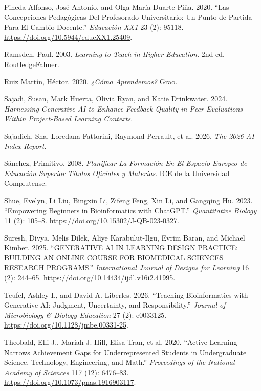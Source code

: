 \documentclass[
  11pt,
  a4paper,
  twoside]{scrreprt}
\newlength{\cslhangindent}
\newenvironment{CSLReferences}[2] %
 {\begin{list}{}{%
  \setlength{\itemindent}{0pt}
  \setlength{\leftmargin}{0pt}
  \setlength{\parsep}{0pt}
  \ifodd #1
   \setlength{\leftmargin}{\cslhangindent}
   \setlength{\itemindent}{-1\cslhangindent}
  \fi
  \setlength{\itemsep}{#2\baselineskip}}}
 {\end{list}}
\begin{document}
\begin{CSLReferences}{1}{1}
Pineda-Alfonso, José Antonio, and Olga María Duarte Piña. 2020. {``Las
Concepciones Pedagógicas Del Profesorado Universitario: Un Punto de
Partida Para El Cambio Docente.''} \emph{Educación XX1} 23 (2): 95118.
\url{https://doi.org/10.5944/educXX1.25409}.

Ramsden, Paul. 2003. \emph{Learning to Teach in Higher Education}. 2nd
ed. RoutledgeFalmer.

Ruiz Martín, Héctor. 2020. \emph{¿Cómo Aprendemos?} Grao.

Sajadi, Susan, Mark Huerta, Olivia Ryan, and Katie Drinkwater. 2024.
\emph{Harnessing {Generative} {AI} to {Enhance} {Feedback} {Quality} in
{Peer} {Evaluations} Within {Project}-{Based} {Learning} {Contexts}}.

Sajadieh, Sha, Loredana Fattorini, Raymond Perrault, et al. 2026.
\emph{The 2026 AI Index Report}.

Sánchez, Primitivo. 2008. \emph{Planificar La Formación En El Espacio
Europeo de Educación Superior Títulos Oficiales y Materias}. ICE de la
Universidad Complutense.

Shue, Evelyn, Li Liu, Bingxin Li, Zifeng Feng, Xin Li, and Gangqing Hu.
2023. {``Empowering Beginners in Bioinformatics with ChatGPT.''}
\emph{Quantitative Biology} 11 (2): 105--8.
\url{https://doi.org/10.15302/J-QB-023-0327}.

Suresh, Divya, Melis Dilek, Aliye Karabulut-Ilgu, Evrim Baran, and
Michael Kimber. 2025. {``GENERATIVE AI IN LEARNING DESIGN PRACTICE:
BUILDING AN ONLINE COURSE FOR BIOMEDICAL SCIENCES RESEARCH PROGRAMS.''}
\emph{International Journal of Designs for Learning} 16 (2): 244--65.
\url{https://doi.org/10.14434/ijdl.v16i2.41995}.

Teufel, Ashley I., and David A. Liberles. 2026. {``Teaching
Bioinformatics with Generative {AI}: Judgment, Uncertainty, and
Responsibility.''} \emph{Journal of Microbiology \& Biology Education}
27 (2): e0033125. \url{https://doi.org/10.1128/jmbe.00331-25}.

Theobald, Elli J., Mariah J. Hill, Elisa Tran, et al. 2020. {``Active
Learning Narrows Achievement Gaps for Underrepresented Students in
Undergraduate Science, Technology, Engineering, and Math.''}
\emph{Proceedings of the National Academy of Sciences} 117 (12):
6476--83. \url{https://doi.org/10.1073/pnas.1916903117}.


\end{CSLReferences}
\end{document}
